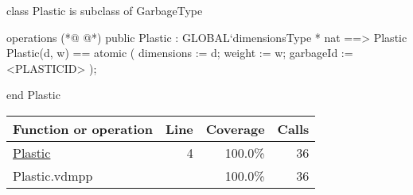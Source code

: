 \begin{vdmpp}[breaklines=true]
class Plastic is subclass of GarbageType

operations
(*@
\label{Plastic:4}
@*)
public Plastic : GLOBAL`dimensionsType * nat ==> Plastic
Plastic(d, w) == 
    atomic 
    (
        dimensions := d;
        weight := w;
        garbageId := <PLASTICID>
    );


end Plastic
\end{vdmpp}
\bigskip
\begin{longtable}{|l|r|r|r|}
\hline
Function or operation & Line & Coverage & Calls \\
\hline
\hline
\hyperref[Plastic:4]{Plastic} & 4&100.0\% & 36 \\
\hline
\hline
Plastic.vdmpp & & 100.0\% & 36 \\
\hline
\end{longtable}

